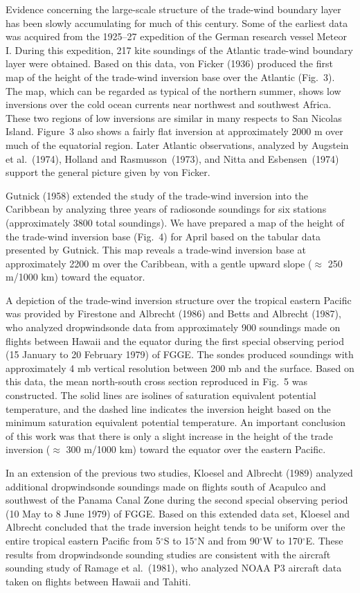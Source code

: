      Evidence concerning the large-scale structure of the trade-wind boundary
layer has been slowly accumulating for much of this century.  Some of the
earliest data was acquired from the 1925--27 expedition of the German research
vessel Meteor I.  During this expedition, 217 kite soundings of the Atlantic
trade-wind boundary layer were obtained.  Based on this data, von Ficker
(1936) produced the first map of the height of the trade-wind inversion base
over the Atlantic (Fig.~3).  The map, which can be regarded as typical of the
northern summer, shows low inversions over the cold ocean currents near
northwest and southwest Africa.  These two regions of low inversions are
similar in many respects to San Nicolas Island.  Figure~3 also shows a fairly
flat inversion at approximately 2000 m over much of the equatorial region.
Later Atlantic observations, analyzed by Augstein et al.~(1974), Holland and
Rasmusson~(1973), and Nitta and Esbensen~(1974) support the general picture
given by von Ficker.

     Gutnick (1958) extended the study of the trade-wind inversion into the
Caribbean by analyzing three years of radiosonde soundings for six stations
(approximately 3800 total soundings). We have prepared a map of the height of
the trade-wind inversion base (Fig.~4) for April based on the tabular data
presented by Gutnick. This map reveals a trade-wind inversion base at
approximately 2200 m over the Caribbean, with a gentle upward slope
($\approx$ 250 m/1000 km) toward the equator.

     A depiction of the trade-wind inversion structure over the tropical
eastern Pacific was provided by Firestone and Albrecht (1986) and Betts and
Albrecht (1987), who analyzed dropwindsonde data from approximately 900
soundings made on flights between Hawaii and the equator during the first
special observing period (15 January to 20 February 1979) of FGGE.  The sondes
produced soundings with approximately 4 mb vertical resolution between 200 mb
and the surface.  Based on this data, the mean north-south cross section
reproduced in Fig.~5 was constructed.  The solid lines are isolines of
saturation equivalent potential temperature, and the dashed line indicates the
inversion height based on the minimum saturation equivalent potential
temperature.  An important conclusion of this work was that there is only a
slight increase in the height of the trade inversion ($\approx$ 300 m/1000 km)
toward the equator over the eastern Pacific.

     In an extension of the previous two studies, Kloesel and Albrecht (1989)
analyzed additional dropwindsonde soundings made on flights south of Acapulco
and southwest of the Panama Canal Zone during the second special observing
period (10 May to 8 June 1979) of FGGE.  Based on this extended data set,
Kloesel and Albrecht concluded that the trade inversion height tends to be
uniform over the entire tropical eastern Pacific from 5$^\circ$S to
15$^\circ$N and from 90$^\circ$W to 170$^\circ$E.  These results from
dropwindsonde sounding studies are consistent with the aircraft sounding study
of Ramage et al.\ (1981), who analyzed NOAA P3 aircraft data taken on flights
between Hawaii and Tahiti.


